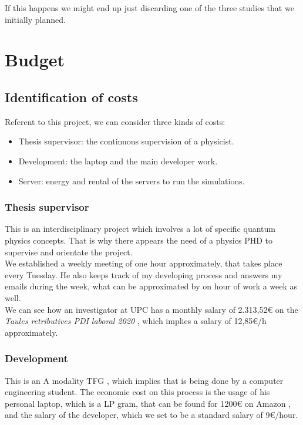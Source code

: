 \documentclass{article}
\begin{document}
If this happens we might end up just discarding one of the three studies that we initially planned. 


\section{Budget}
\subsection{Identification of costs}
Referent to this project, we can consider three kinds of costs:
\begin{itemize}
    \item Thesis supervisor: the continuous supervision of a physicist.
    \item Development: the laptop and the main developer work.
    \item Server: energy and rental of the servers to run the simulations.
\end{itemize}

\subsubsection{Thesis supervisor}
This is an interdisciplinary project which involves a lot of specific quantum physics concepts. That is why there appears the need of a physics PHD to supervise and orientate the project.\\

We established a weekly meeting of one hour approximately, that takes place every Tuesday. He also keeps track of my developing process and answers my emails during the week, what can be approximated by on hour of work a week as well.\\

We can see how an investigator at UPC has a monthly salary of 2.313,52€ on the \textit{Taules retributives PDI laboral 2020} \cite{TR}, which implies a salary of 12,85€/h approximately.

\subsubsection{Development}
This is an A modality TFG \cite{TFG_docu}, which implies that is being done by a computer engineering student. 
The economic cost on this process is the usage of his personal laptop, which is a LP gram, that can be found for 1200€ on Amazon \cite{LG}, and the salary of the developer, which we set to be a standard salary of 9€/hour.   
\end{document}

